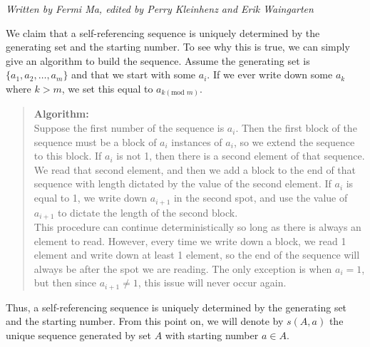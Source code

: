 \documentclass[runningheads,a4paper]{llncs}
\begin{document}
\emph{Written by Fermi Ma, edited by Perry Kleinhenz and Erik Waingarten}

We claim that a self-referencing sequence is uniquely determined by the generating set and the starting number. To see why this is true, we can simply give an algorithm to build the sequence. Assume the generating set is $\{a_1,a_2,\dots,a_m\}$ and that we start with some $a_i$. If we ever write down some $a_k$ where $k > m$, we set this equal to $a_{k (\text{mod } m)}$.
\begin{quote}
\textbf{Algorithm:}\\
Suppose the first number of the sequence is $a_i$. Then the first block of the sequence must be a block of $a_i$ instances of $a_i$, so we extend the sequence to this block. If $a_i$ is not 1, then there is a second element of that sequence. We read that second element, and then we add a block to the end of that sequence with length dictated by the value of the second element. If $a_i$ is equal to 1, we write down $a_{i+1}$ in the second spot, and use the value of $a_{i+1}$ to dictate the length of the second block.\\

This procedure can continue deterministically so long as there is always an element to read. However, every time we write down a block, we read 1 element and write down at least 1 element, so the end of the sequence will always be after the spot we are reading. The only exception is when $a_i = 1$, but then since $a_{i+1} \neq 1$, this issue will never occur again.
\end{quote}

Thus, a self-referencing sequence is uniquely determined by the generating set and the starting number. From this point on, we will denote by $s(A,a)$ the unique sequence generated by set $A$ with starting number $a \in A$.
\end{document}
